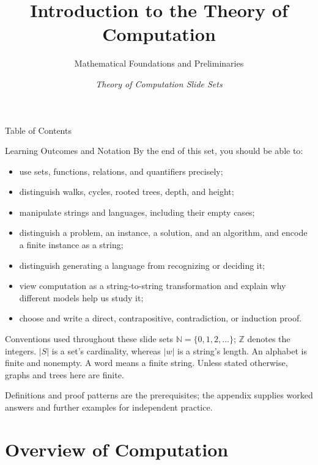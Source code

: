 \documentclass[10pt]{beamer}
\title[Introduction to ToC]{Introduction to the Theory of Computation}
\subtitle{Mathematical Foundations and Preliminaries}
\author[SDB]{}
\date[Slide Set 1]{\scriptsize \textit{Theory of Computation Slide Sets}}
\begin{document}
\begin{frame}
  \titlepage
\end{frame}

\begin{frame}{Table of Contents}
  \tableofcontents
\end{frame}

\begin{frame}{Learning Outcomes and Notation}
  \small
  By the end of this set, you should be able to:
  \begin{itemize}
    \item use sets, functions, relations, and quantifiers precisely;
    \item distinguish walks, cycles, rooted trees, depth, and height;
    \item manipulate strings and languages, including their empty cases;
    \item distinguish a problem, an instance, a solution, and an algorithm,
      and encode a finite instance as a string;
    \item distinguish generating a language from recognizing or deciding it;
    \item view computation as a string-to-string transformation and explain
      why different models help us study it;
    \item choose and write a direct, contrapositive, contradiction, or
      induction proof.
  \end{itemize}
  \pause
  \begin{block}{Conventions used throughout these slide sets}
    $\mathbb{N}=\{0,1,2,\ldots\}$; $\mathbb{Z}$ denotes the integers.
    $|S|$ is a set's cardinality, whereas $|w|$ is a string's length.
    An alphabet is finite and nonempty. A word means a finite string.
    Unless stated otherwise, graphs and trees here are finite.
  \end{block}
  Definitions and proof patterns are the prerequisites; the appendix
  supplies worked answers and further examples for independent practice.
\end{frame}

\section{Overview of Computation}
\end{document}
